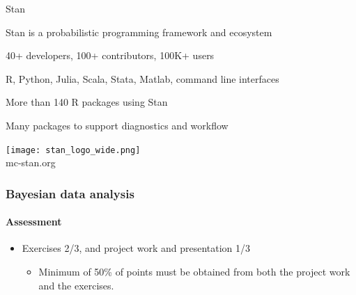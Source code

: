 \documentclass[english]{beamer}
\begin{document}
\begin{frame}{Stan}
  
  Stan is a probabilistic programming framework and ecosystem

  40+ developers, 100+ contributors, 100K+ users

  R, Python, Julia, Scala, Stata, Matlab, command line interfaces
  
  More than 140 R packages using Stan

  Many packages to support diagnostics and workflow
  
  \center
  \vspace{\baselineskip}
  \texttt{[image: stan\_logo\_wide.png]}\\
  mc-stan.org

\end{frame}

\begin{frame}
  \frametitle{Bayesian data analysis}  %
  \framesubtitle{Assessment}
  \begin{itemize}
  \item Exercises 2/3, and project work and presentation 1/3
     \begin{itemize}
     \item Minimum of 50\% of points must be obtained from both the project work and the exercises.
     \end{itemize}
  \end{itemize}

\end{frame}
\end{document}
